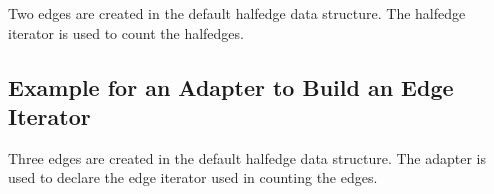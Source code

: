 Two edges are created in the default halfedge data structure.
The halfedge iterator is used to count the halfedges.


\subsection{Example for an Adapter to Build an Edge Iterator}

Three edges are created in the default halfedge data structure.
The adapter  is used to declare the edge
iterator used in counting the edges.




